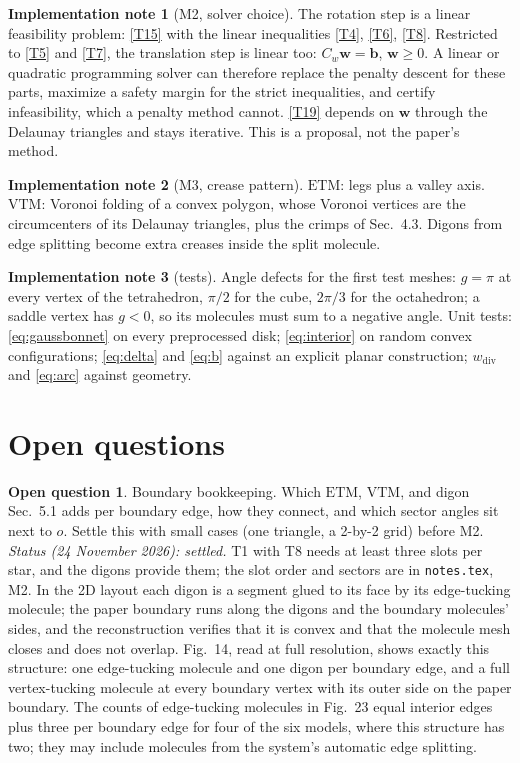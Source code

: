 \documentclass[11pt]{article}
\theoremstyle{definition}
\newtheorem{openq}{Open question}
\newtheorem{impl}{Implementation note}
\newcommand{\ETM}{\mathrm{ETM}}
\newcommand{\VTM}{\mathrm{VTM}}
\newcommand{\wv}{\mathbf{w}}
\begin{document}
\begin{impl}[M2, solver choice]
The rotation step is a linear feasibility problem: \eqref{T15} with the linear
inequalities \eqref{T4}, \eqref{T6}, \eqref{T8}. Restricted to \eqref{T5} and
\eqref{T7}, the translation step is linear too: $C_w\wv = \mathbf b$,
$\wv \ge 0$. A linear or quadratic programming solver can therefore replace the
penalty descent for these parts, maximize a safety margin for the strict
inequalities, and certify infeasibility, which a penalty method cannot.
\eqref{T19} depends on $\wv$ through the Delaunay triangles and stays
iterative. This is a proposal, not the paper's method.
\end{impl}

\begin{impl}[M3, crease pattern]
$\ETM$: legs plus a valley axis. $\VTM$: Voronoi folding of a convex polygon,
whose Voronoi vertices are the circumcenters of its Delaunay triangles, plus
the crimps of Sec.~4.3. Digons from edge splitting become extra creases inside
the split molecule.
\end{impl}

\begin{impl}[tests]
Angle defects for the first test meshes: $g = \pi$ at every vertex of the
tetrahedron, $\pi/2$ for the cube, $2\pi/3$ for the octahedron; a saddle vertex
has $g < 0$, so its molecules must sum to a negative angle. Unit tests:
\eqref{eq:gaussbonnet} on every preprocessed disk; \eqref{eq:interior} on random
convex configurations; \eqref{eq:delta} and \eqref{eq:b} against an explicit
planar construction; $w_{\mathrm{div}}$ and \eqref{eq:arc} against geometry.
\end{impl}

\section{Open questions}\label{sec:open}

\begin{openq}\label{oq:boundary}
Boundary bookkeeping. Which $\ETM$, $\VTM$, and digon Sec.~5.1 adds per boundary
edge, how they connect, and which sector angles sit next to $o$. Settle this
with small cases (one triangle, a 2-by-2 grid) before M2.
\emph{Status (24 November 2026): settled.} T1 with T8 needs at least three
slots per star, and the digons provide them; the slot order and sectors are in
\texttt{notes.tex}, M2. In the 2D layout each digon is a segment glued to its
face by its edge-tucking molecule; the paper boundary runs along the digons
and the boundary molecules' sides, and the reconstruction verifies that it is
convex and that the molecule mesh closes and does not overlap. Fig.~14, read
at full resolution, shows exactly this structure: one edge-tucking molecule
and one digon per boundary edge, and a full vertex-tucking molecule at every
boundary vertex with its outer side on the paper boundary. The counts of
edge-tucking molecules in Fig.~23 equal interior edges plus three per boundary
edge for four of the six models, where this structure has two; they may
include molecules from the system's automatic edge splitting.
\end{openq}
\end{document}
